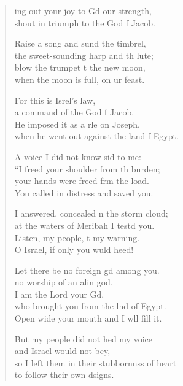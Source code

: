 \settowidth{\versewidth}{so I left them in their stubbornness of heart *}
\begin{verse}%
  \begin{patverse}
ing out your joy to Gd our strength,\Med\\
shout in triumph to the God f Jacob.

Raise a song and sund the timbrel,\Med\\
the sweet-sounding harp and th lute;\\
blow the trumpet t the new moon,\Med\\
when the moon is full, on ur feast.

For this is Isrel’s law,\Med\\
a command of the God f Jacob.\\
He imposed it as a rle on Joseph,\Med\\
when he went out against the land f Egypt.

A voice I did not know sid to me:\Med\\
“I freed your shoulder from th burden;\\
your hands were freed frm the load.\Med\\
You called in distress and  saved you.

I answered, concealed \pointup{\i}n the storm cloud;\Med\\
at the waters of Meribah I testd you.\\
Listen, my people, t my warning.\Med\\
O Israel, if only you wuld heed!

Let there be no foreign gd among you.\Med\\
no worship of an alin god.\\
I am the Lord your Gd,\Flex\\
who brought you from the lnd of Egypt.\Med\\
Open wide your mouth and I w\pointup{\i}ll fill it.

But my people did not hed my voice\Med\\
and Israel would not bey,\\
so I left them in their stubbornnss of heart\Med\\
to follow their own dsigns.


\end{patverse}
\end{verse}

